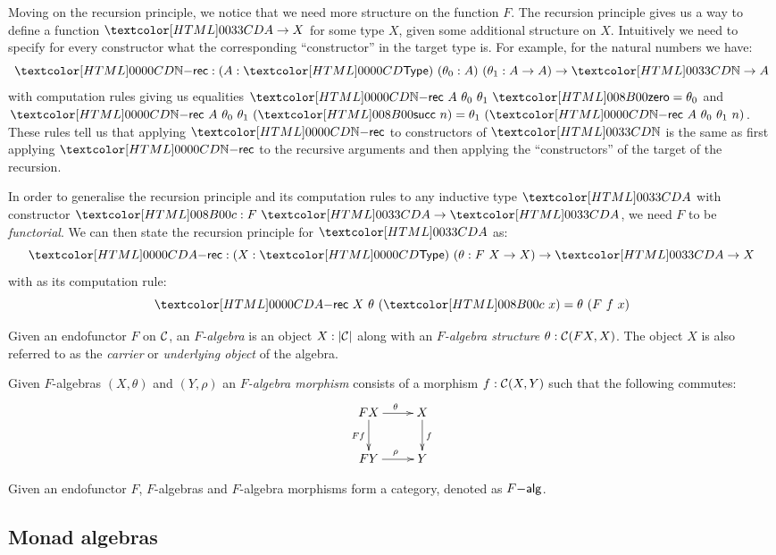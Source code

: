 Moving on the recursion principle, we notice that we need more
structure on the function $F$. The recursion principle gives us a way
to define a function $\Aty \to X$ for some type $X$, given some
additional structure on $X$. Intuitively we need to specify for every
constructor what the corresponding ``constructor'' in the target type
is. For example, for the natural numbers we have:
$$
\natrec : (A : \Type)\ (\theta_0 : A)\ (\theta_1 : A \to A) \to \natty \to A
$$
with computation rules giving us equalities
$\natrec\ A\ \theta_0\ \theta_1\ \natzero = \theta_0$ and
$\natrec\ A\ \theta_0\ \theta_1\ (\natsucc\ n) = \theta_1\ (\natrec\
A\ \theta_0\ \theta_1\ n)$.
These rules tell us that applying $\natrec$ to constructors of
$\natty$ is the same as first applying $\natrec$ to the recursive
arguments and then applying the ``constructors'' of the target of the
recursion.

In order to generalise the recursion principle and its computation
rules to any inductive type $\Aty$ with constructor
$\Ac : F\ \Aty \to \Aty$, we need $F$ to be \emph{functorial}. We can
then state the recursion principle for $\Aty$ as:
$$
\Arec : (X : \Type)\ (\theta : F\ X \to X) \to \Aty \to X
$$
with as its computation rule:
$$
\Arec\ X\ \theta\ (\Ac\ x) = \theta\ (F\ f\ x)
$$


\begin{definition}
  Given an endofunctor $F$ on $\mathcal{C}$, an \emph{$F$-algebra} is an
  object $X : | \mathcal{C} |$ along with an \emph{$F$-algebra structure}
  $\theta : \mathcal{C}(F X, X)$. The object $X$ is also referred to as the
  \emph{carrier} or \emph{underlying object} of the algebra.
\end{definition}

\begin{definition}
  Given $F$-algebras $(X,\theta)$ and $(Y,\rho)$ an \emph{$F$-algebra
    morphism} consists of a morphism $f : \mathcal{C}(X,Y)$ such that the
  following commutes:
  $$
  \xymatrix{
    FX \ar[r]^{\theta} \ar[d]_{Ff} &X \ar[d]^{f} \\
    FY \ar[r]^{\rho} &Y
  }
  $$
\end{definition}

\begin{proposition}
  Given an endofunctor $F$, $F$-algebras and $F$-algebra morphisms
  form a category, denoted as $F\mathsf{-alg}$.
\end{proposition}

\subsection{Monad algebras}


